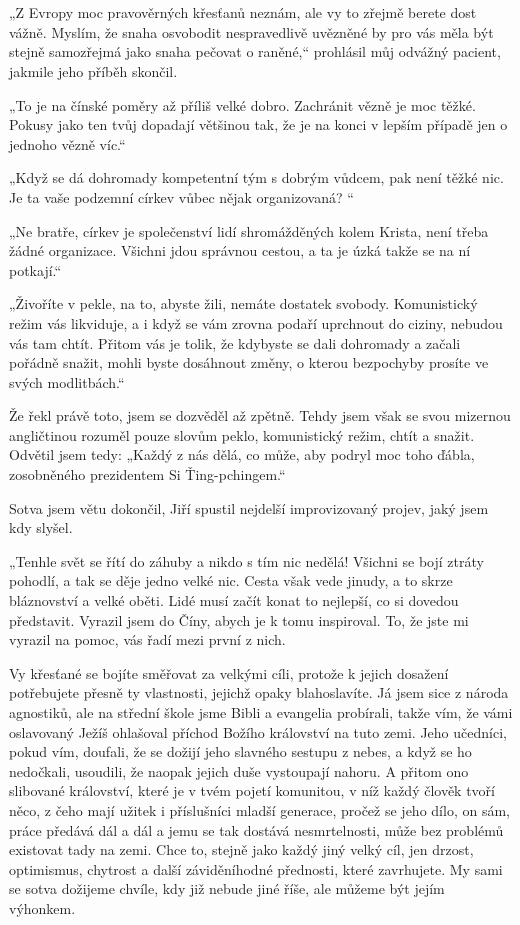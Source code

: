 \chapter{}

„Z Evropy moc pravověrných křesťanů neznám, ale vy to zřejmě berete dost vážně. Myslím, že snaha osvobodit nespravedlivě uvězněné by pro vás měla být stejně samozřejmá jako snaha pečovat o raněné,“ prohlásil můj odvážný pacient, jakmile jeho příběh skončil.

„To je na čínské poměry až příliš velké dobro. Zachránit vězně je moc těžké. Pokusy jako ten tvůj dopadají většinou tak, že je na konci v lepším případě jen o jednoho vězně víc.“

„Když se dá dohromady kompetentní tým s dobrým vůdcem, pak není těžké nic. Je ta vaše podzemní církev vůbec nějak organizovaná? “

„Ne bratře, církev je společenství lidí shromážděných kolem Krista, není třeba žádné organizace. Všichni jdou správnou cestou, a ta je úzká takže se na ní potkají.“

„Živoříte v pekle, na to, abyste žili, nemáte dostatek svobody. Komunistický režim vás likviduje, a i když se vám zrovna podaří uprchnout do ciziny, nebudou vás tam chtít. Přitom vás je tolik, že kdybyste se dali dohromady a začali pořádně snažit, mohli byste dosáhnout změny, o kterou bezpochyby prosíte ve svých modlitbách.“

Že řekl právě toto, jsem se dozvěděl až zpětně. Tehdy jsem však se svou mizernou angličtinou rozuměl pouze slovům peklo, komunistický režim, chtít a snažit. Odvětil jsem tedy: „Každý z nás dělá, co může, aby podryl moc toho ďábla, zosobněného prezidentem Si Ťing-pchingem.“

Sotva jsem větu dokončil, Jiří spustil nejdelší improvizovaný projev, jaký jsem kdy slyšel.

„Tenhle svět se řítí do záhuby a nikdo s tím nic nedělá! Všichni se bojí ztráty pohodlí, a tak se děje jedno velké nic.
Cesta však vede jinudy, a to skrze bláznovství a velké oběti. Lidé musí začít konat to nejlepší, co si dovedou představit. Vyrazil jsem do Číny, abych je k tomu inspiroval. To, že jste mi vyrazil na pomoc, vás řadí mezi první z nich. 

Vy křesťané se bojíte směřovat za velkými cíli, protože k jejich dosažení potřebujete přesně ty vlastnosti, jejichž opaky blahoslavíte. Já jsem sice z národa agnostiků, ale na střední škole jsme Bibli a evangelia probírali, takže vím, že vámi oslavovaný Ježíš ohlašoval příchod Božího království na tuto zemi. Jeho učedníci, pokud vím, doufali, že se dožijí jeho slavného sestupu z nebes, a když se ho nedočkali, usoudili, že naopak jejich duše vystoupají nahoru. A přitom ono slibované království, které je v tvém pojetí komunitou, v níž každý člověk tvoří něco, z čeho mají užitek i příslušníci mladší generace, pročež se jeho dílo, on sám, práce předává dál a dál a jemu se tak dostává nesmrtelnosti, může bez problémů existovat tady na zemi. Chce to, stejně jako každý jiný velký cíl, jen drzost, optimismus, chytrost a další záviděníhodné přednosti, které zavrhujete. My sami se sotva dožijeme chvíle, kdy již nebude jiné říše, ale můžeme být jejím výhonkem.

